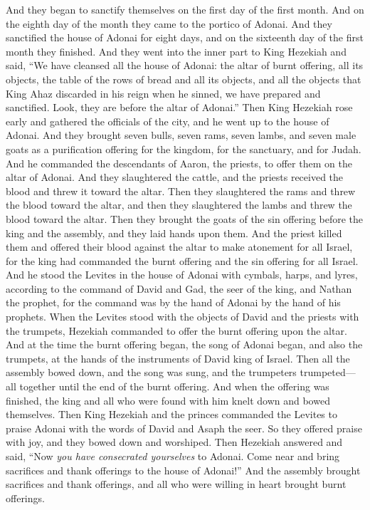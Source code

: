 \begin{biblechapter}
\verse And they began to sanctify themselves on the first day of the first month. And on the eighth day of the month they came to the portico of Adonai. And they sanctified the house of Adonai for eight days, and on the sixteenth day of the first month they finished.
\verse And they went into the inner part to King Hezekiah and said, “We have cleansed all the house of Adonai: the altar of burnt offering, all its objects, the table of the rows of bread and all its objects,
\verse and all the objects that King Ahaz discarded in his reign when he sinned, we have prepared and sanctified. Look, they are before the altar of Adonai.”
\verse Then King Hezekiah rose early and gathered the officials of the city, and he went up to the house of Adonai.
\verse And they brought seven bulls, seven rams, seven lambs, and seven male goats as a purification offering for the kingdom, for the sanctuary, and for Judah. And he commanded the descendants of Aaron, the priests, to offer them on the altar of Adonai.
\verse And they slaughtered the cattle, and the priests received the blood and threw it toward the altar. Then they slaughtered the rams and threw the blood toward the altar, and then they slaughtered the lambs and threw the blood toward the altar.
\verse Then they brought the goats of the sin offering before the king and the assembly, and they laid hands upon them.
\verse And the priest killed them and offered their blood against the altar to make atonement for all Israel, for the king had commanded the burnt offering and the sin offering for all Israel.
\verse And he stood the Levites in the house of Adonai with cymbals, harps, and lyres, according to the command of David and Gad, the seer of the king, and Nathan the prophet, for the command was by the hand of Adonai by the hand of his prophets.
\verse When the Levites stood with the objects of David and the priests with the trumpets,
\verse Hezekiah commanded to offer the burnt offering upon the altar. And at the time the burnt offering began, the song of Adonai began, and also the trumpets, at the hands of the instruments of David king of Israel.
\verse Then all the assembly bowed down, and the song was sung, and the trumpeters trumpeted—all together until the end of the burnt offering.
\verse And when the offering was finished, the king and all who were found with him knelt down and bowed themselves.
\verse Then King Hezekiah and the princes commanded the Levites to praise Adonai with the words of David and Asaph the seer. So they offered praise with joy, and they bowed down and worshiped.
\verse Then Hezekiah answered and said, “Now \textit{you have consecrated yourselves} to Adonai. Come near and bring sacrifices and thank offerings to the house of Adonai!” And the assembly brought sacrifices and thank offerings, and all who were willing in heart brought burnt offerings.

\end{biblechapter}
